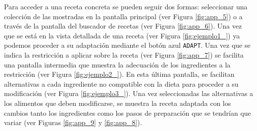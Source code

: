 Para acceder a una receta concreta se pueden seguir dos formas: seleccionar una colección de las mostradas en la pantalla principal (ver Figura \ref{fig:app_5}) o a través de la pantalla del buscador de recetas (ver Figura \ref{fig:app_6}). Una vez que se está en la vista detallada de una receta (ver Figura \ref{fig:ejemplo1_}) ya podemos proceder a su adaptación mediante el botón azul \texttt{ADAPT}. Una vez que se indica la restricción a aplicar sobre la receta (ver Figura \ref{fig:app_7}) se facilita una pantalla intermedia que muestra la adecuación de los ingredientes a la restricción (ver Figura \ref{fig:ejemplo2_}). En esta última pantalla, se facilitan alternativas a cada ingrediente no compatible con la dieta para proceder a su modificación (ver Figura \ref{fig:ejemplo3_}). Una vez seleccionadas las alternativas a los alimentos que deben modificarse, se muestra la receta adaptada con los cambios tanto los ingredientes como los pasos de preparación que se tendrían que variar (ver Figuras \ref{fig:app_9} y \ref{fig:app_8}). 

